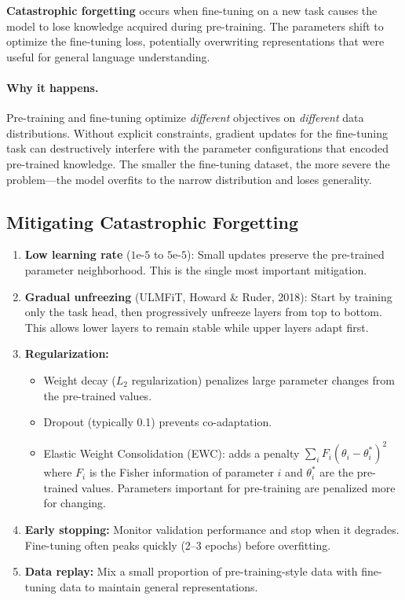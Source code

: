\textbf{Catastrophic forgetting} occurs when fine-tuning on a new task causes
the model to lose knowledge acquired during pre-training.  The parameters
shift to optimize the fine-tuning loss, potentially overwriting representations
that were useful for general language understanding.

\paragraph{Why it happens.}
Pre-training and fine-tuning optimize \emph{different} objectives on
\emph{different} data distributions.  Without explicit constraints, gradient
updates for the fine-tuning task can destructively interfere with the parameter
configurations that encoded pre-trained knowledge.  The smaller the fine-tuning
dataset, the more severe the problem---the model overfits to the narrow
distribution and loses generality.

\subsection{Mitigating Catastrophic Forgetting}

\begin{enumerate}
    \item \textbf{Low learning rate} ($1\text{e-}5$ to $5\text{e-}5$):
          Small updates preserve the pre-trained parameter neighborhood.
          This is the single most important mitigation.

    \item \textbf{Gradual unfreezing} (ULMFiT, Howard \& Ruder, 2018):
          Start by training only the task head, then progressively unfreeze
          layers from top to bottom.  This allows lower layers to remain
          stable while upper layers adapt first.

    \item \textbf{Regularization:}
          \begin{itemize}
              \item Weight decay ($L_2$ regularization) penalizes large parameter
                    changes from the pre-trained values.
              \item Dropout (typically 0.1) prevents co-adaptation.
              \item Elastic Weight Consolidation (EWC): adds a penalty
                    $\sum_i F_i (\theta_i - \theta_i^*)^2$ where $F_i$ is the
                    Fisher information of parameter $i$ and $\theta_i^*$ are the
                    pre-trained values.  Parameters important for pre-training
                    are penalized more for changing.
          \end{itemize}

    \item \textbf{Early stopping:} Monitor validation performance and stop when
          it degrades.  Fine-tuning often peaks quickly (2--3 epochs) before
          overfitting.

    \item \textbf{Data replay:} Mix a small proportion of pre-training-style
          data with fine-tuning data to maintain general representations.
\end{enumerate}

